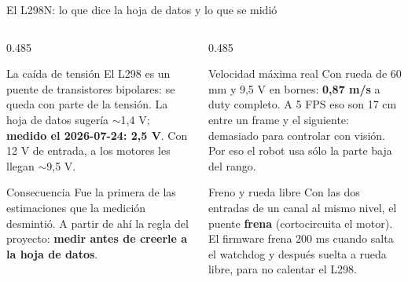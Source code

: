\begin{frame}{El L298N: lo que dice la hoja de datos y lo que se midió}
  \begin{columns}[T,onlytextwidth]
    \begin{column}{0.485\textwidth}
      \begin{block}{La caída de tensión}
        El L298 es un puente de transistores bipolares: se queda con parte de
        la tensión. La hoja de datos sugería $\sim$1,4 V; \textbf{medido el
        2026-07-24: 2,5 V}. Con 12 V de entrada, a los motores les llegan
        $\sim$9,5 V.
      \end{block}
      \begin{block}{Consecuencia}
        Fue la primera de las estimaciones que la medición desmintió. A partir
        de ahí la regla del proyecto: \textbf{medir antes de creerle a la
        hoja de datos}.
      \end{block}
    \end{column}
    \begin{column}{0.485\textwidth}
      \begin{block}{Velocidad máxima real}
        Con rueda de 60 mm y 9,5 V en bornes: \textbf{0,87 m/s} a duty
        completo. A 5 FPS eso son 17 cm entre un frame y el siguiente:
        demasiado para controlar con visión. Por eso el robot usa sólo la
        parte baja del rango.
      \end{block}
      \begin{block}{Freno y rueda libre}
        Con las dos entradas de un canal al mismo nivel, el puente \textbf{frena}
        (cortocircuita el motor). El firmware frena 200 ms cuando salta el
        watchdog y después suelta a rueda libre, para no calentar el L298.
      \end{block}
    \end{column}
  \end{columns}
\end{frame}


